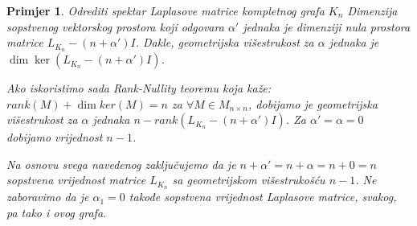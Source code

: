 \documentclass[11pt]{article}
\newtheorem{example}{Primjer}
\begin{document}
\begin{example}{Odrediti spektar Laplasove matrice kompletnog grafa $K_n$}
	Dimenzija sopstvenog vektorskog prostora koji odgovara $\alpha'$ jednaka je dimenziji nula prostora matrice $L_{K_n} - (n + \alpha') I$.
	Dakle, geometrijska višestrukost za  $\alpha$ jednaka je $\dim \ker(L_{K_n} - (n + \alpha') I)$.

	Ako iskoristimo sada Rank-Nullity teoremu koja kaže:
	$rank(M) + \dim ker(M) = n$ za $\forall M \in M_{n \times n}$, dobijamo je geometrijska višestrukost za $\alpha$ jednaka $n - rank(L_{K_n} - (n + \alpha') I)$.
	Za $\alpha' = \alpha = 0$ dobijamo vrijednost $n-1$.
	
	Na osnovu svega navedenog zaključujemo da je $n + \alpha' = n + \alpha = n + 0 = n$ sopstvena vrijednost matrice $L_{K_n}$ sa geometrijskom višestrukošću $n-1$. Ne zaboravimo da je $\alpha_1=0$ takođe sopstvena vrijednost Laplasove matrice, svakog, pa tako i ovog grafa.
	

\end{example}
\end{document}

